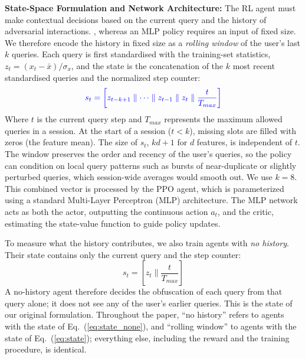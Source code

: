 \documentclass[conference]{IEEEtran}
\DeclareRobustCommand{\rev}[1]{{\color{blue}#1}}
\DeclareRobustCommand{\revnew}[1]{{\color{revpurple}#1}}
\begin{document}
\textbf{State-Space Formulation and Network Architecture:}
The RL agent must make contextual decisions based on the current query and the history of adversarial interactions. \rev{\revnew{The user's query history grows with every query}, whereas an MLP policy requires an input of fixed size. We therefore encode the history in fixed size as a \emph{rolling window} of the user's last $k$ queries. Each query is first standardised with the training-set statistics, $z_t = (x_t - \bar{x})/\sigma_x$, and the state is the concatenation of the $k$ most recent standardised queries and the normalized step counter:}
\begin{equation}
\rev{s_t = \left[z_{t-k+1} \parallel \dots \parallel z_{t-1} \parallel z_t \parallel \frac{t}{T_{max}}\right]}
\label{eq:state}
\end{equation}
Where $t$ is the current query step and $T_{max}$ represents the maximum allowed queries in a session. \rev{At the start of a session ($t<k$), missing slots are filled with zeros (the feature mean). The size of $s_t$, $kd+1$ for $d$ features, is independent of $t$. The window preserves the order and recency of the user's queries, so the policy can condition on local query patterns such as bursts of near-duplicate or slightly perturbed queries, which session-wide averages would smooth out. We use $k=8$.} This combined vector is processed by the PPO agent, which is parameterized using a standard Multi-Layer Perceptron (MLP) architecture. The MLP network acts as both the actor, outputting the continuous action $a_t$, and the critic, estimating the state-value function to guide policy updates.

\revnew{To measure what the history contributes, we also train agents with \emph{no history}. Their state contains only the current query and the step counter:
\begin{equation}
s_t = \left[z_t \parallel \frac{t}{T_{max}}\right]
\label{eq:state_none}
\end{equation}
A no-history agent therefore decides the obfuscation of each query from that query alone; it does not see any of the user's earlier queries. This is the state of our original formulation. Throughout the paper, ``no history'' refers to agents with the state of Eq.~(\ref{eq:state_none}), and ``rolling window'' to agents with the state of Eq.~(\ref{eq:state}); everything else, including the reward and the training procedure, is identical.}
\end{document}

